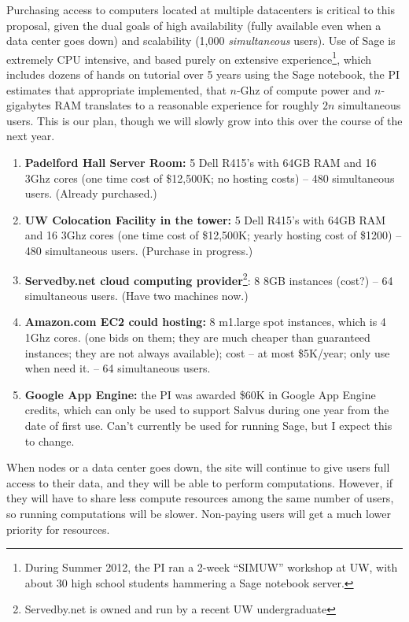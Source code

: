 \documentclass[11pt]{article}
\begin{document}
Purchasing access to computers located at multiple datacenters is
critical to this proposal, given the dual goals of high availability
(fully available even when a data center goes down) and scalability
(1,000 {\em simultaneous} users).  Use of Sage is extremely CPU
intensive, and based purely on extensive experience\footnote{During
  Summer 2012, the PI ran a 2-week ``SIMUW'' workshop at UW, with
  about 30 high school students hammering a Sage notebook server.},
which includes dozens of hands on tutorial over 5 years using the Sage
notebook, the PI estimates that appropriate implemented, that $n$-Ghz
of compute power and $n$-gigabytes RAM translates to a reasonable
experience for roughly $2n$ simultaneous users.  This is our plan,
though we will slowly grow into this over the course of the next year.

\begin{enumerate}
\item {\bf Padelford Hall Server Room:} 5 Dell R415's with 64GB RAM
  and 16 3Ghz cores (one time cost of \$12,500K; no hosting costs) --
  480 simultaneous users.   (Already purchased.)

\item {\bf UW Colocation Facility in the tower:} 5 Dell R415's with
  64GB RAM and 16 3Ghz cores (one time cost of \$12,500K; yearly
  hosting cost of \$1200) -- 480 simultaneous users.  (Purchase in progress.)

\item {\bf Servedby.net cloud computing
  provider}\footnote{Servedby.net is owned and run by a recent UW 
  undergraduate}: 8 8GB instances (cost?) -- 64 simultaneous users.
  (Have two machines now.)

\item {\bf Amazon.com EC2 could hosting:} 8 m1.large spot instances,
  which is 4 1Ghz cores. (one bids on them; they are much cheaper than
  guaranteed instances; they are not always available); cost -- at
  most \$5K/year; only use when need it. -- 64 simultaneous users.

\item {\bf Google App Engine:} the PI was awarded \$60K in Google App
  Engine credits, which can only be used to support Salvus during one
  year from the date of first use.  Can't currently be used for
  running Sage, but I expect this to change.
\end{enumerate}

When nodes or a data center goes down, the site will continue to give
users full access to their data, and they will be able to perform
computations.  However, if they will have to share less compute
resources among the same number of users, so running computations will
be slower.  Non-paying users will get a much lower priority for
resources.   
\end{document}
